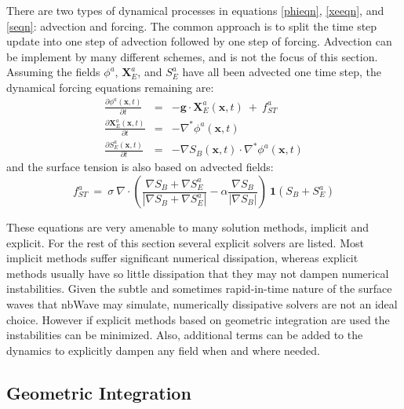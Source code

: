 \documentclass{article}
\def\xvec{\textbf{x}}
\def\gvec{\textbf{g}}
\def\Xvec{\textbf{X}}
\def\inabla{\nabla^{*}}
\begin{document}
There are two types of dynamical processes in equations \ref{phieqn}, \ref{xeeqn}, and \ref{seqn}: advection and forcing.  The common approach is to split the time step update into one step of advection followed by one step of forcing.  Advection can be implement by many different schemes, and is not the focus of this section.
 Assuming the fields $\phi^a$, $\Xvec_E^a$, and $S_E^a$ have all been advected one time step, the dynamical forcing equations remaining are:
\begin{eqnarray}
\frac{\partial \phi^a(\xvec,t)}{\partial t}  &=& -\gvec\cdot\Xvec_E^a(\xvec,t)\ +\  f_{ST}^a  \label{phieqn2}\\
\frac{\partial \Xvec_E^a(\xvec,t)}{\partial t} &=& -\inabla\phi^a(\xvec,t) \label{xeeqn2}\\
\frac{\partial S_E^a(\xvec,t)}{\partial t} &=& -\nabla S_B(\xvec,t)\cdot\inabla\phi^a(\xvec,t) \label{seqn2}
\end{eqnarray}
and the surface tension is also based on advected fields:
\begin{equation}
f_{ST}^a \ =\  \sigma\  \nabla\cdot\left(  \frac{\nabla S_B + \nabla S_E^a}{ |  \nabla S_B + \nabla S_E^a |  } - \alpha  \frac{\nabla S_B}{ |  \nabla S_B |  } \right) \ \textbf{1}(S_B+S_E^a)
\end{equation} 

These equations are very amenable to many solution methods, implicit and explicit. For the rest of this section several explicit solvers are listed.  Most implicit methods suffer significant numerical dissipation, whereas explicit methods usually have so little dissipation that they may not dampen numerical instabilities.  Given the subtle and sometimes rapid-in-time nature of the surface waves that nbWave may simulate, numerically dissipative solvers are not an ideal choice.  However if explicit methods based on geometric integration are used the instabilities can be minimized.  Also, additional terms can be added to the dynamics to explicitly dampen any field when and where needed.

\subsection{Geometric Integration}
\end{document}
